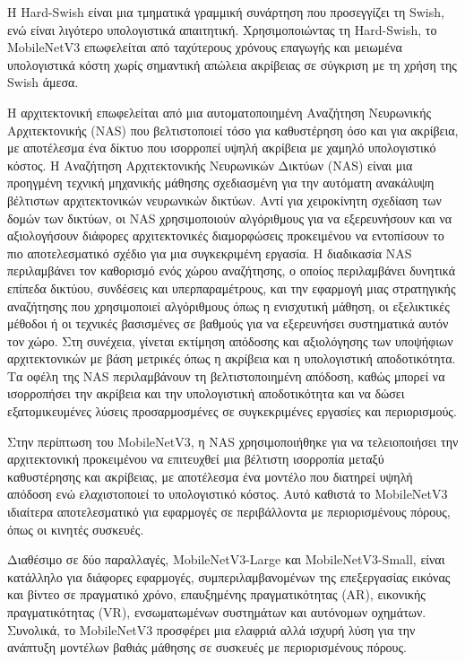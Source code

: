 Η Hard-Swish είναι μια τμηματικά γραμμική συνάρτηση που προσεγγίζει τη Swish, ενώ είναι λιγότερο υπολογιστικά απαιτητική. Χρησιμοποιώντας τη Hard-Swish, το MobileNetV3 επωφελείται από ταχύτερους χρόνους επαγωγής και μειωμένα υπολογιστικά κόστη χωρίς σημαντική απώλεια ακρίβειας σε σύγκριση με τη χρήση της Swish άμεσα.

Η αρχιτεκτονική επωφελείται από μια αυτοματοποιημένη Αναζήτηση Νευρωνικής Αρχιτεκτονικής (NAS) που βελτιστοποιεί τόσο για καθυστέρηση όσο και για ακρίβεια, με αποτέλεσμα ένα δίκτυο που ισορροπεί υψηλή ακρίβεια με χαμηλό υπολογιστικό κόστος. Η Αναζήτηση Αρχιτεκτονικής Νευρωνικών Δικτύων (NAS) είναι μια προηγμένη τεχνική μηχανικής μάθησης σχεδιασμένη για την αυτόματη ανακάλυψη βέλτιστων αρχιτεκτονικών νευρωνικών δικτύων. Αντί για χειροκίνητη σχεδίαση των δομών των δικτύων, οι NAS χρησιμοποιούν αλγόριθμους για να εξερευνήσουν και να αξιολογήσουν διάφορες αρχιτεκτονικές διαμορφώσεις προκειμένου να εντοπίσουν το πιο αποτελεσματικό σχέδιο για μια συγκεκριμένη εργασία. Η διαδικασία NAS περιλαμβάνει τον καθορισμό ενός χώρου αναζήτησης, ο οποίος περιλαμβάνει δυνητικά επίπεδα δικτύου, συνδέσεις και υπερπαραμέτρους, και την εφαρμογή μιας στρατηγικής αναζήτησης που χρησιμοποιεί αλγόριθμους όπως η ενισχυτική μάθηση, οι εξελικτικές μέθοδοι ή οι τεχνικές βασισμένες σε βαθμούς για να εξερευνήσει συστηματικά αυτόν τον χώρο. Στη συνέχεια, γίνεται εκτίμηση απόδοσης και αξιολόγησης των υποψήφιων αρχιτεκτονικών με βάση μετρικές όπως η ακρίβεια και η υπολογιστική αποδοτικότητα. Τα οφέλη της NAS περιλαμβάνουν τη βελτιστοποιημένη απόδοση, καθώς μπορεί να ισορροπήσει την ακρίβεια και την υπολογιστική αποδοτικότητα και να δώσει εξατομικευμένες λύσεις προσαρμοσμένες σε συγκεκριμένες εργασίες και περιορισμούς. 

Στην περίπτωση του MobileNetV3, η NAS χρησιμοποιήθηκε για να τελειοποιήσει την αρχιτεκτονική προκειμένου να επιτευχθεί μια βέλτιστη ισορροπία μεταξύ καθυστέρησης και ακρίβειας, με αποτέλεσμα ένα μοντέλο που διατηρεί υψηλή απόδοση ενώ ελαχιστοποιεί το υπολογιστικό κόστος. Αυτό καθιστά το MobileNetV3 ιδιαίτερα αποτελεσματικό για εφαρμογές σε περιβάλλοντα με περιορισμένους πόρους, όπως οι κινητές συσκευές.

Διαθέσιμο σε δύο παραλλαγές, MobileNetV3-Large και MobileNetV3-Small, είναι κατάλληλο για διάφορες εφαρμογές, συμπεριλαμβανομένων της επεξεργασίας εικόνας και βίντεο σε πραγματικό χρόνο, επαυξημένης πραγματικότητας (AR), εικονικής πραγματικότητας (VR), ενσωματωμένων συστημάτων και αυτόνομων οχημάτων. Συνολικά, το MobileNetV3 προσφέρει μια ελαφριά αλλά ισχυρή λύση για την ανάπτυξη μοντέλων βαθιάς μάθησης σε συσκευές με περιορισμένους πόρους.

